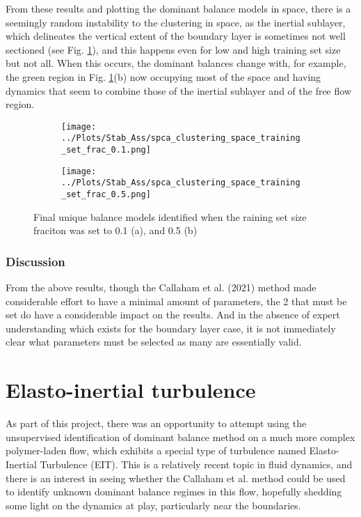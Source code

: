 \documentclass[12pt]{report} %
\begin{document}
From these results and plotting the dominant balance models in space, there is a seemingly random instability to the clustering in space, as the inertial sublayer, which delineates the vertical extent of the boundary layer is sometimes not well sectioned (see Fig. \ref{fig:diff_train_frac_clustering}), and this happens even for low and high training set size but not all. When this occurs, the dominant balances change with, for example, the green region in Fig. \ref{fig:diff_train_frac_clustering}(b) now occupying most of the space and having dynamics that seem to combine those of the inertial sublayer and of the free flow region.

\begin{figure}[htbp]
  \centering
  \begin{subfigure}[b]{0.7\textwidth}
    \texttt{[image: ../Plots/Stab\_Ass/spca\_clustering\_space\_training\_set\_frac\_0.1.png]}
    \caption{}
  \end{subfigure}
  \begin{subfigure}[b]{0.7\textwidth}
      \texttt{[image: ../Plots/Stab\_Ass/spca\_clustering\_space\_training\_set\_frac\_0.5.png]}
      \caption{}
  \end{subfigure}

  \caption{Final unique balance models identified when the raining set size fraciton was set to 0.1 (a), and 0.5 (b)}
  \label{fig:diff_train_frac_clustering}
\end{figure}

\subsection{Discussion}

From the above results, though the Callaham et al. (2021)\cite{callaham2021learning} method made considerable effort to have a minimal amount of parameters, the 2 that must be set do have a considerable impact on the results. And in the absence of expert understanding which exists for the boundary layer case, it is not immediately clear what parameters must be selected as many are essentially valid.




\chapter{Elasto-inertial turbulence}

As part of this project, there was an opportunity to attempt using the unsupervised identification of dominant balance method on a much more complex polymer-laden flow, which exhibits a special type of turbulence named Elasto-Inertial Turbulence (EIT). This is a relatively recent topic in fluid dynamics, and there is an interest in seeing whether the Callaham et al. method could be used to identify unknown dominant balance regimes in this flow, hopefully shedding some light on the dynamics at play, particularly near the boundaries.
\end{document}
